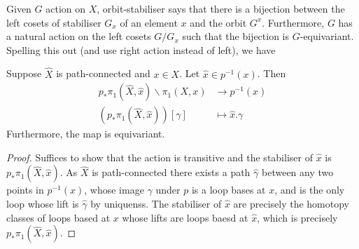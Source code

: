 \documentclass[a4paper]{article}
\begin{document}
Given \(G\) action on \(X\), orbit-stabiliser says that there is a bijection between the left cosets of stabiliser \(G_x\) of an element \(x\) and the orbit \(G^x\). Furthermore, \(G\) has a natural action on the left cosets \(G/G_x\) such that the bijection is \(G\)-equivariant. Spelling this out (and use right action instead of left), we have

\begin{lemma}
  Suppose \(\hat X\) is path-connected and \(x \in X\). Let \(\hat x \in p^{-1}(x)\). Then
  \begin{align*}
    p_*\pi_1(\hat X, \hat x) \backslash \pi_1(X, x) &\to p^{-1}(x) \\
    (p_* \pi_1(\hat X, \hat x)) [\gamma] &\mapsto \hat x. \gamma
  \end{align*}
  Furthermore, the map is equivariant.
\end{lemma}

\begin{proof}
  Suffices to show that the action is transitive and the stabiliser of \(\hat x\) is \(p_* \pi_1(\hat X, \hat x)\). As \(\hat X\) is path-connected there exists a path \(\hat \gamma\) between any two points in \(p^{-1}(x)\), whose image \(\gamma\) under \(p\) is a loop bases at \(x\), and is the only loop whose lift is \(\hat \gamma\) by uniquenss. The stabiliser of \(\hat x\) are precisely the homotopy classes of loops based at \(x\) whose lifts are loops baesd at \(\hat x\), which is precisely \(p_* \pi_1(\hat X, \hat x)\).
\end{proof}



























\printindex
\end{document}
